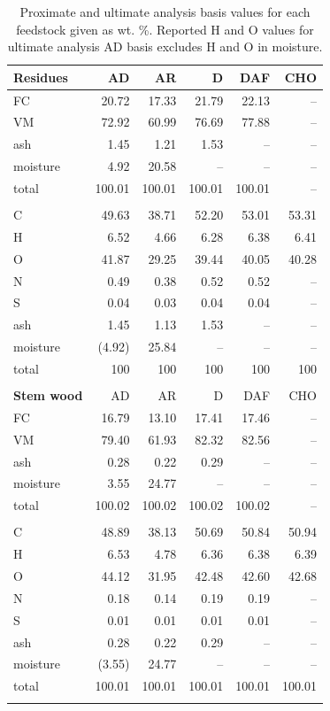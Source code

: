 \newpage
\begin{longtable}{lrrrrr}
    \caption{Proximate and ultimate analysis basis values for each feedstock given as wt. \%. Reported H and O values for ultimate analysis AD basis excludes H and O in moisture.}
    \label{tab:basis} \\

    \textbf{Residues} & AD & AR & D & DAF & CHO \\
    \midrule
    FC       & 20.72  & 17.33  & 21.79  & 22.13  & -- \\
    VM       & 72.92  & 60.99  & 76.69  & 77.88  & -- \\
    ash      & 1.45   & 1.21   & 1.53   & --     & -- \\
    moisture & 4.92   & 20.58  & --     & --     & -- \\
    total    & 100.01 & 100.01 & 100.01 & 100.01 & -- \\
    \\
    C        & 49.63  & 38.71 & 52.20 & 53.01 & 53.31 \\
    H        & 6.52   & 4.66  & 6.28  & 6.38  & 6.41 \\
    O        & 41.87  & 29.25 & 39.44 & 40.05 & 40.28 \\
    N        & 0.49   & 0.38  & 0.52  & 0.52  & -- \\
    S        & 0.04   & 0.03  & 0.04  & 0.04  & -- \\
    ash      & 1.45   & 1.13  & 1.53  & --    & -- \\
    moisture & (4.92) & 25.84 & --    & --    & -- \\
    total    & 100    & 100   & 100   & 100   & 100 \\
    \\

    \textbf{Stem wood} & AD & AR & D & DAF & CHO \\
    \midrule
    FC       & 16.79  & 13.10  & 17.41  & 17.46  & -- \\
    VM       & 79.40  & 61.93  & 82.32  & 82.56  & -- \\
    ash      & 0.28   & 0.22   & 0.29   & --     & -- \\
    moisture & 3.55   & 24.77  & --     & --     & -- \\
    total    & 100.02 & 100.02 & 100.02 & 100.02 & -- \\
    \\
    C        & 48.89  & 38.13  & 50.69  & 50.84  & 50.94 \\
    H        & 6.53   & 4.78   & 6.36   & 6.38   & 6.39 \\
    O        & 44.12  & 31.95  & 42.48  & 42.60  & 42.68 \\
    N        & 0.18   & 0.14   & 0.19   & 0.19   & -- \\
    S        & 0.01   & 0.01   & 0.01   & 0.01   & -- \\
    ash      & 0.28   & 0.22   & 0.29   & --     & -- \\
    moisture & (3.55) & 24.77  & --     & --     & -- \\
    total    & 100.01 & 100.01 & 100.01 & 100.01 & 100.01 \\
    \\


\end{longtable}
